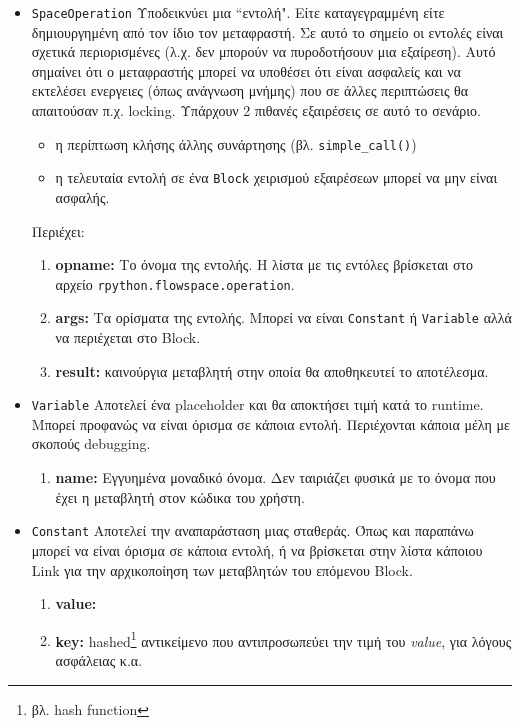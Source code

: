 \begin{itemize}
\item \texttt{SpaceOperation} Υποδεικνύει μια ``εντολή". Είτε καταγεγραμμένη 
είτε δημιουργημένη από τον ίδιο τον μεταφραστή. Σε αυτό το σημείο οι εντολές 
είναι σχετικά περιορισμένες (λ.χ. δεν μπορούν να πυροδοτήσουν μια εξαίρεση).
Αυτό σημαίνει ότι ο μεταφραστής μπορεί να υποθέσει ότι είναι ασφαλείς και να
εκτελέσει ενεργειες (όπως ανάγνωση μνήμης) που σε άλλες περιπτώσεις θα
απαιτούσαν π.χ. locking. Υπάρχουν 2 πιθανές εξαιρέσεις σε αυτό το σενάριο.

\begin{itemize}
\item η περίπτωση κλήσης άλλης συνάρτησης (βλ. \texttt{simple\_call()})
\item η τελευταία εντολή σε ένα \texttt{Block} χειρισμού εξαιρέσεων μπορεί να
μην είναι ασφαλής.
\end{itemize}

Περιέχει:

\begin{enumerate}

\item \textbf{opname:} Το όνομα της εντολής. Η λίστα με τις εντόλες βρίσκεται 
στο αρχείο \texttt{rpython.flowspace.operation}.
\item \textbf{args:} Τα ορίσματα της εντολής. Μπορεί να είναι \texttt{Constant}
ή \texttt{Variable} αλλά να περιέχεται στο Block.
\item \textbf{result:} καινούργια μεταβλητή στην οποία θα αποθηκευτεί το 
αποτέλεσμα.
\end{enumerate}

\item \texttt{Variable} Αποτελεί ένα placeholder και θα αποκτήσει τιμή κατά το
runtime. Μπορεί προφανώς να είναι όρισμα σε κάποια εντολή. Περιέχονται κάποια 
μέλη με σκοπούς debugging.

\begin{enumerate}
\item \textbf{name:} Εγγυημένα μοναδικό όνομα. Δεν ταιριάζει φυσικά με το 
όνομα που έχει η μεταβλητή στον κώδικα του χρήστη.
\end{enumerate}

\item \texttt{Constant} Αποτελεί την αναπαράσταση μιας σταθεράς. Όπως και 
παραπάνω μπορεί να είναι όρισμα σε κάποια εντολή, ή να βρίσκεται στην λίστα 
κάποιου Link για την αρχικοποίηση των μεταβλητών του επόμενου Block.

\begin{enumerate}
\item \textbf{value:}
\item \textbf{key:} hashed\footnote{βλ. hash function} αντικείμενο που 
αντιπροσωπεύει την τιμή του \textit{value}, για λόγους ασφάλειας κ.α.
\end{enumerate}

\end{itemize}

